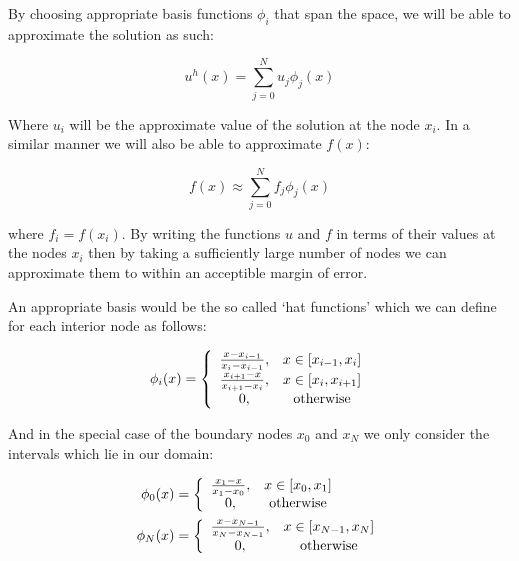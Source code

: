 By choosing appropriate basis functions $\phi_i$ that span the space, we will be able to approximate 
the solution as such:

\begin{equation}\label{eq:one-d-approx-soln}
	u^h(x) = \sum_{j = 0}^N{u_j\phi_j(x)}
\end{equation}

Where $u_i$ will be the approximate value of the solution at the node $x_i$. In a similar manner we will
also be able to approximate $f(x)$:

\begin{equation}
	f(x) \approx \sum_{j = 0}^N f_j\phi_j(x)
\end{equation}

where $f_i = f(x_i)$. By writing the functions $u$ and $f$ in terms of their values at the nodes $x_i$
then by taking a sufficiently large number of nodes we can approximate them to within an acceptible margin
of error.


An appropriate basis would be the so called `hat functions' which we can define for each interior node
as follows:

\begin{equation}\label{eq:one-d-hat-basis}
	\phi_i(x) = \left\{\begin{array}{c c}
    				\frac{x - x_{i-1}}{x_i - x_{i - 1}}, & x \in [x_{i-1}, x_i] \\
                    \frac{x_{i+1} - x}{x_{i + 1} - x_i}, & x \in [x_i, x_{i + 1}] \\
                    0, & \text{otherwise}
                \end{array}\right.
\end{equation}

And in the special case of the boundary nodes $x_0$ and $x_N$ we only consider the intervals which lie in our
domain:

\begin{align}
	\phi_0(x) &= \left\{\begin{array}{c c}
                    \frac{x_1 - x}{x_1 - x_0}, & x \in [x_0, x_1] \\
                    0, & \text{otherwise}
    \end{array}\right.
    \\
	\phi_N(x) &= \left\{\begin{array}{c c}
                    \frac{x - x_{N - 1}}{x_N - x_{N-1}}, & x \in [x_{N-1}, x_N] \\
                    0, & \text{otherwise}
    \end{array}\right.
\end{align}

